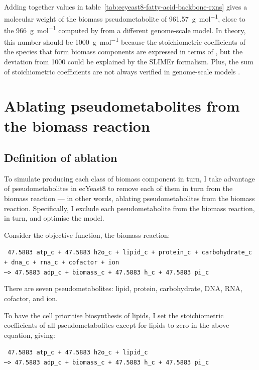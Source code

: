 Adding together values in table~\ref{tab:ecyeast8-fatty-acid-backbone-rxns} gives a molecular weight of the biomass pseudometabolite of \SI{961.57}{\gram~\mol^{-1}}, close to the \SI{966}{\gram~\mol^{-1}} computed by \textcite{takhaveevTemporalSegregationBiosynthetic2023} from a different genome-scale model.
In theory, this number should be \SI{1000}{\gram~\mol^{-1}} because the stoichiometric coefficients of the species that form biomass components are expressed in terms of \SI{}{\mmolgdw} \parencite{thieleProtocolGeneratingHighquality2010, palssonSystemsBiologyConstraintbased2015}, but the deviation from 1000 could be explained by the SLIMEr formalism.
Plus, the sum of stoichiometric coefficients are not always verified in genome-scale models \parencite{chanStandardizingBiomassReactions2017}.


\section{Ablating pseudometabolites from the biomass reaction}
\label{sec:model-yeast8-pseudometabolites}

\subsection{Definition of ablation}
\label{sec:model-yeast8-pseudometabolites-def}

To simulate producing each class of biomass component in turn,
I take advantage of pseudometabolites in ecYeast8 to remove each of them in turn from the biomass reaction ---
in other words, ablating pseudometabolites from the biomass reaction.
Specifically, I exclude each pseudometabolite from the biomass reaction, in turn, and optimise the model.

Consider the objective function, the biomass reaction:

\texttt{
  47.5883 atp\_c + 47.5883 h2o\_c + lipid\_c + protein\_c + carbohydrate\_c\\
  + dna\_c + rna\_c + cofactor + ion \\
  --> 47.5883 adp\_c + biomass\_c + 47.5883 h\_c + 47.5883 pi\_c
}

There are seven pseudometabolites: lipid, protein, carbohydrate, DNA, RNA, cofactor, and ion.

To have the cell prioritise biosynthesis of lipids, I set the stoichiometric coefficients of all pseudometabolites except for lipids to zero in the above equation, giving:

\texttt{
  47.5883 atp\_c + 47.5883 h2o\_c + lipid\_c \\
  --> 47.5883 adp\_c + biomass\_c + 47.5883 h\_c + 47.5883 pi\_c
}

